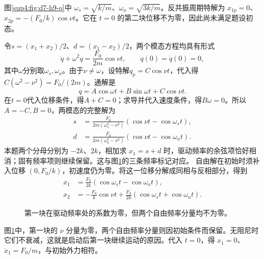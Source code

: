 \begin{solution}
图\ref{sup4:fig:d7-h9-q}中 $\omega_s=\sqrt{k/m}$、$\omega_a=\sqrt{3k/m}$。反共振周期特解为 $x_{1p}=0$、$x_{2p}=-(F_0/k)\cos\nu t$。它在 $t=0$ 的第二块位移不为零，因此尚未满足题设初态。

令$s=(x_1+x_2)/2$、$d=(x_1-x_2)/2$，两个模态方程均具有形式
\[
\ddot q+\omega^2q=\frac{F_0}{2m}\cos\nu t,
\qquad q(0)=\dot q(0)=0,
\]
其中$\omega$分别取$\omega_s,\omega_a$。由于$\nu\ne\omega$，设特解$q_p=C\cos\nu t$，代入得$C(\omega^2-\nu^2)=F_0/(2m)$。通解是
\[
q=A\cos\omega t+B\sin\omega t+C\cos\nu t.
\]
在$t=0$代入位移条件，得$A+C=0$；求导并代入速度条件，得$B\omega=0$。所以$A=-C,B=0$，两模态的完整解为
\[
\begin{aligned}
s&=\frac{F_0}{2m(\omega_s^2-\nu^2)}(\cos\nu t-\cos\omega_st),\\
d&=\frac{F_0}{2m(\omega_a^2-\nu^2)}(\cos\nu t-\cos\omega_at).
\end{aligned}
\]
本题两个分母分别为 $-2k$、$2k$，相加求 $x_1=s+d$ 时，驱动频率的余弦项恰好相消；固有频率项则继续保留。这与图\ref{sup4:fig:d7-h9-s}的三条频率标记对应。
自由解在初始时须补入位移 $(0,F_0/k)$，初速度仍为零。将这一位移分解成同相与反相部分，得到
\[
\boxed{\begin{aligned}
x_1&=\frac{F_0}{2k}(\cos\omega_st-\cos\omega_at),\\
x_2&=-\frac{F_0}{k}\cos\nu t+\frac{F_0}{2k}(\cos\omega_st+\cos\omega_at).
\end{aligned}}
\]
\begin{figure}[H]\centering
{}
\caption{第一块在驱动频率处的系数为零，但两个自由频率分量均不为零。}\label{sup4:fig:d7-h9-s}
\end{figure}
图\ref{sup4:fig:d7-h9-s}中，第一块的 $\nu$ 分量为零，两个自由频率分量则因初始条件而保留。无阻尼时它们不衰减，这就是启动后第一块继续运动的原因。代入 $t=0$，得 $x_1=0$、$\ddot x_1=F_0/m$，与初始外力相符。
\end{solution}


